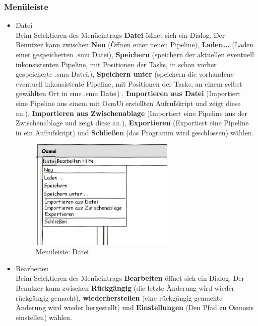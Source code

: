 \documentclass[a4paper,12pt]{scrartcl}
\begin{document}
\subsubsection{Menüleiste}
\begin{itemize}
\item Datei\\
Beim Selektieren des Menüeintrags \textbf{Datei} öffnet sich ein Dialog. Der Benutzer kann zwischen \textbf{Neu} (Öffnen einer neuen Pipeline), \textbf{Laden...} (Laden einer gespeicherten .smu Datei), \textbf{Speichern} (speichern der aktuellen eventuell inkonsistenten Pipeline, mit Positionen der Tasks, in schon vorher gespeicherte .smu Datei.), \textbf{Speichern unter} (speichern die vorhandene eventuell inkonsistente Pipeline, mit Positionen der Tasks, an einem selbst gewählten Ort in eine .smu Datei) , \textbf{Importieren aus Datei} (Importiert eine Pipeline aus einem mit OsmUi erstellten Aufrufskript und zeigt diese an.), \textbf{Importieren aus Zwischenablage} (Importiert eine Pipeline aus der Zwischenablage und zeigt diese an.), \textbf{Exportieren} (Exportiert eine Pipeline in ein Aufrufskript) und \textbf{Schließen} (das Programm wird geschlossen) wählen. 
\\ 
\begin{center}
\begin{figure}[h!]
\begin{center}
\includegraphics[width=7cm]{ui_prototype/OsmUi_Dateiklein.png}
\caption{Menüleiste: Datei}
\end{center}
\end{figure}
\end{center}
\item Bearbeiten\\
Beim Selektieren des Menüeintrags \textbf{Bearbeiten} öffnet sich ein Dialog. Der Benutzer kann zwischen \textbf{Rückgängig} (die letzte Änderung wird wieder rückgängig gemacht), \textbf{wiederherstellen} (eine rückgängig gemachte Änderung wird wieder hergestellt) und \textbf{Einstellungen} (Den Pfad zu Osmosis einstellen) wählen.

\end{itemize}
\end{document}
